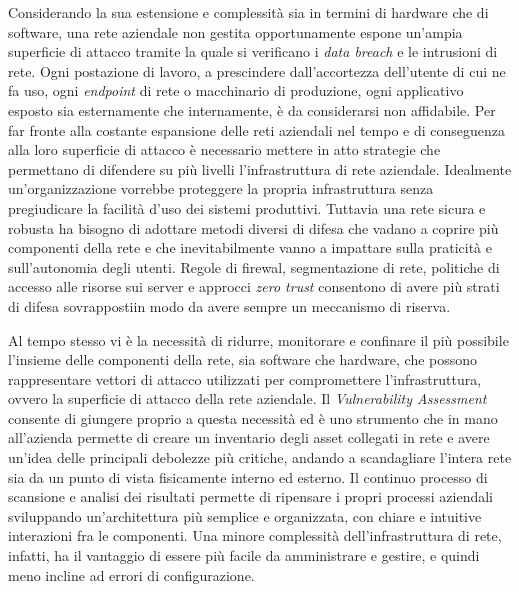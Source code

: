 \documentclass[target=bach,aauheader=]{thud}
\begin{document}
Considerando la sua estensione e complessità sia in termini di hardware che di software, una rete aziendale non gestita opportunamente espone un'ampia superficie di attacco tramite la quale si verificano i \textit{data breach} e le intrusioni di rete. Ogni postazione di lavoro, a prescindere dall'accortezza dell'utente di cui ne fa uso, ogni \textit{endpoint} di rete o macchinario di produzione, ogni applicativo esposto sia esternamente che internamente, è da considerarsi non affidabile. Per far fronte alla costante espansione delle reti aziendali nel tempo e di conseguenza alla loro superficie di attacco è necessario mettere in atto strategie che permettano di difendere su più livelli l'infrastruttura di rete aziendale. Idealmente un'organizzazione vorrebbe proteggere la propria infrastruttura senza pregiudicare la facilità d'uso dei sistemi produttivi. Tuttavia una rete sicura e robusta ha bisogno di adottare metodi diversi di difesa che vadano a coprire più componenti della rete e che inevitabilmente vanno a impattare sulla praticità e sull'autonomia degli utenti. Regole di firewal, segmentazione di rete, politiche di accesso alle risorse sui server e approcci \textit{zero trust} consentono di avere più strati di difesa sovrappostiin modo da avere sempre un meccanismo di riserva.

Al tempo stesso vi è la necessità di ridurre, monitorare e confinare il più possibile l'insieme delle componenti della rete, sia software che hardware, che possono rappresentare vettori di attacco utilizzati per compromettere l'infrastruttura, ovvero la superficie di attacco della rete aziendale. Il \textit{Vulnerability Assessment} consente di giungere proprio a questa necessità ed è uno strumento che in mano all'azienda permette di creare un inventario degli asset collegati in rete e avere un'idea delle principali debolezze più critiche, andando a scandagliare l'intera rete sia da un punto di vista fisicamente interno ed esterno. Il continuo processo di scansione e analisi dei risultati permette di ripensare i propri processi aziendali sviluppando un'architettura più semplice e organizzata, con chiare e intuitive interazioni fra le componenti. Una minore complessità dell'infrastruttura di rete, infatti, ha il vantaggio di essere più facile da amministrare e gestire, e quindi meno incline ad errori di configurazione.


\appendix

\end{document}
